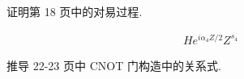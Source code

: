 \documentclass{assignment}
\begin{document}
\begin{prob}
    证明第 18 页中的对易过程.
\end{prob}
\begin{sol}
    \begin{align}
        He^{i\alpha_4Z/2}Z^{s_4}
    \end{align}
\end{sol}

\begin{prob}
    推导 22-23 页中 CNOT 门构造中的关系式.
\end{prob}
\begin{sol}
    
\end{sol}
\end{document}
